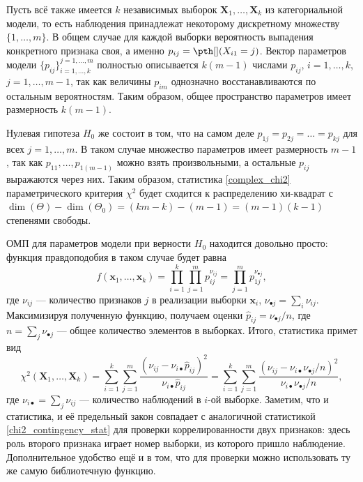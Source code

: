 Пусть всё также имеется $k$ независимых выборок $\mathbf X_1, \ldots, \mathbf X_k$ из категориальной модели, то есть наблюдения принадлежат некоторому дискретному множеству $\{1, \ldots, m\}$. В общем случае для каждой выборки вероятность выпадения конкретного признака своя, а именно $p_{ij} = \pth[](X_{i1} = j)$. Вектор параметров модели $\{p_{ij}\}_{i=1,\ldots, k}^{j=1, \ldots, m}$ полностью описывается $k(m-1)$ числами $p_{ij}$, $i=1,\ldots, k$, $j=1,\ldots, m-1$, так как величины $p_{im}$ однозначно восстанавливаются по остальным вероятностям. Таким образом, общее пространство параметров имеет размерность $k(m-1)$.

Нулевая гипотеза $H_0$ же состоит в том, что на самом деле $p_{1j} = p_{2j} = \ldots = p_{kj}$ для всех $j=1,\ldots, m$. В таком случае множество параметров имеет размерность $m-1$, так как $p_{11}, \ldots, p_{1(m-1)}$ можно взять произвольными, а остальные $p_{ij}$ выражаются через них. Таким образом, статистика \eqref{complex_chi2} параметрического критерия $\chi^2$ будет сходится к распределению хи-квадрат с $\dim(\Theta) - \dim(\Theta_0) = (km-k)-(m-1) = (m-1)(k-1)$ степенями свободы.

ОМП для параметров модели при верности $H_0$ находится довольно просто: функция правдоподобия в таком случае будет равна
\[
f(\mathbf x_1, \ldots, \mathbf x_k) = \prod_{i=1}^k\prod_{j=1}^m p_{ij}^{\nu_{ij}} = \prod_{j=1}^m p_{1j}^{\nu_{\bullet j}},
\]
где $\nu_{ij}$ --- количество признаков $j$ в реализации выборки $\mathbf x_i$, $\nu_{\bullet j} = \sum_i \nu_{ij}$. Максимизируя полученную функцию, получаем оценки $\widehat p_{ij} = \nu_{\bullet j} / n$, где $n = \sum_j \nu_{\bullet j}$ --- общее количество элементов в выборках. Итого, статистика примет вид
\[
\chi^2(\mathbf X_1, \ldots, \mathbf X_k) = \sum_{i=1}^k \sum_{j=1}^m \frac{(\nu_{ij} - \nu_{i\bullet} \widehat{p}_{ij})^2}{\nu_{i\bullet} \widehat{p}_{ij}} = \sum_{i=1}^k \sum_{j=1}^m \frac{(\nu_{ij} - \nu_{i\bullet} \nu_{\bullet j} / n)^2}{\nu_{i\bullet} \nu_{\bullet j} / n},
\]
где $\nu_{i\bullet} = \sum_j \nu_{ij}$ --- количество наблюдений в $i$-ой выборке. Заметим, что и статистика, и её предельный закон совпадает с аналогичной статистикой \eqref{chi2_contingency_stat} для проверки коррелированности двух признаков: здесь роль второго признака играет номер выборки, из которого пришло наблюдение. Дополнительное удобство ещё и в том, что для проверки можно использовать ту же самую библиотечную функцию.

